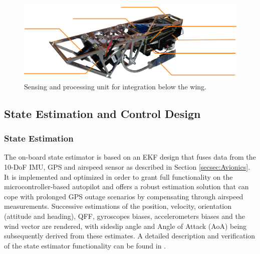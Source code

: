 %  
\begin{figure}[tb]
    \centering
     \includegraphics[width=\linewidth]{images/pod}
    \caption[Modular sensing and processing unit.]{Sensing and processing unit for integration below the wing.}
    \label{f:03_sensor_pod}
\end{figure}

\subsection{State Estimation and Control Design}

\subsubsection{State Estimation} \label{secsec:StateEstimation}

The on-board state estimator is based on an EKF design that fuses data from the 10-DoF IMU, GPS and airspeed sensor as described in Section \ref{secsec:Avionics}. It is implemented and optimized in order to grant full functionality on the microcontroller-based autopilot and offers a robust estimation solution that can cope with prolonged GPS outage scenarios by compensating through airspeed measurements. Successive estimations of the position, velocity, orientation (attitude and heading), QFF, gyroscopes biases, accelerometers biases and the wind vector are rendered, with sideslip angle and Angle of Attack (AoA) being subsequently derived from these estimates. A detailed description and verification of the state estimator functionality can be found in \cite{Leutenegger_MSC2014}.
  
